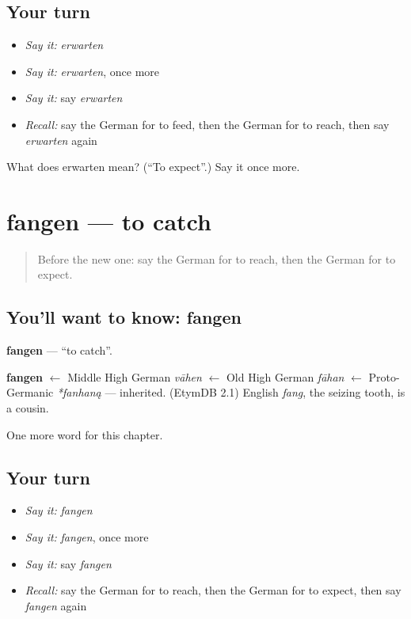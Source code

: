\subsection*{Your turn}
\begin{itemize}
\raggedright
  \item \emph{Say it:} \emph{erwarten}
  \item \emph{Say it:} \emph{erwarten}, once more
  \item \emph{Say it:} say \emph{erwarten}
  \item \emph{Recall:} say the German for to feed, then the German for to reach, then say \emph{erwarten} again
\end{itemize}

\begin{tcolorbox}[breakable,colback=teal!4,colframe=teal!35!black,title={Before you move on}]
What does erwarten mean? (\textquotedblleft{}To expect\textquotedblright{}.) Say it once more.
\end{tcolorbox}
\section[fangen]{fangen — to catch}

\label{lesson:GE-C180-fangen}



\begin{quote}
Before the new one: say the German for to reach, then the German for to expect.
\end{quote}

\subsection*{You'll want to know: fangen}
\textbf{fangen} — \textquotedblleft{}to catch\textquotedblright{}.

\begin{cousinweb}
\textbf{fangen} $\leftarrow$ Middle High German \emph{vāhen} $\leftarrow$ Old High German \emph{fāhan} $\leftarrow$ Proto-Germanic \emph{*fanhaną} — inherited. (EtymDB 2.1) English \emph{fang}, the seizing tooth, is a cousin.
\end{cousinweb}

\begin{grammarlens}[title={What you've built}]
One more word for this chapter.
\end{grammarlens}

\subsection*{Your turn}
\begin{itemize}
\raggedright
  \item \emph{Say it:} \emph{fangen}
  \item \emph{Say it:} \emph{fangen}, once more
  \item \emph{Say it:} say \emph{fangen}
  \item \emph{Recall:} say the German for to reach, then the German for to expect, then say \emph{fangen} again
\end{itemize}

